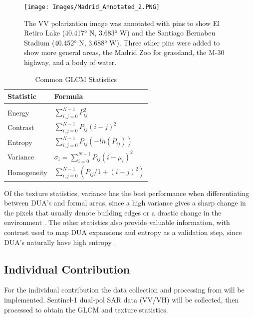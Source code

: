 \documentclass[conference]{IEEEtran}
\begin{document}
		\begin{figure}[htbp]
			\centerline{\texttt{[image: Images/Madrid\_Annotated\_2.PNG]}}
			\caption{The VV polarization image was annotated with pins to show El Retiro Lake (40.417° N, 3.683° W) and the Santiago Bernabeu Stadium (40.452° N, 3.688° W).
				Three other pins were added to show more general areas, the Madrid Zoo for grassland, the M-30 highway, and a body of water.}
			\label{img:Madrid_Annotated}
		\end{figure}
	
		
		\begin{table}[htbp]
			\caption{Common GLCM Statistics}
			\centering
			\begin{tabular}{ll} %
				\\[1ex]
				Statistic & Formula \\ %
				\hline\hline %
				\\[1ex]
				Energy & $\displaystyle\sum_{i,j=0}^{N-1} P_{ij}^2$ \\
				Contrast & $\displaystyle\sum_{i,j=0}^{N-1} P_{ij}(i-j)^2$ \\
				Entropy & $\displaystyle\sum_{i,j=0}^{N-1} P_{ij}(-ln(P_{ij}))$ \\
				Variance & $\sigma_i = \displaystyle\sum_{i=0}^{N-1} P_{ij}(i-\mu_i)^2$ \\
				Homogeneity & $\displaystyle\sum_{i,j=0}^{N-1} (P_{ij}/1+(i-j)^2)$\\[1ex] %
				\hline %
			\end{tabular}
			\label{tab:glcm_formulas}
		\end{table}

		Of the texture statistics, variance has the best performance when differentiating between DUA's and formal areas, since a high variance gives a sharp change in the pixels that usually denote building edges or a drastic change in the environment \cite{Kuffer_2015}.
		The other statistics also provide valuable information, with contrast used to map DUA expansions and entropy as a validation step, since DUA's naturally have high entropy \cite{Kuffer_2016}.
		
	\subsection{Individual Contribution}
		For the individual contribution the data collection and processing from \cite{Hu_2018} will be implemented. 
		Sentinel-1 dual-pol SAR data (VV/VH) will be collected, then processed to obtain the GLCM and texture statistics.
\end{document}
